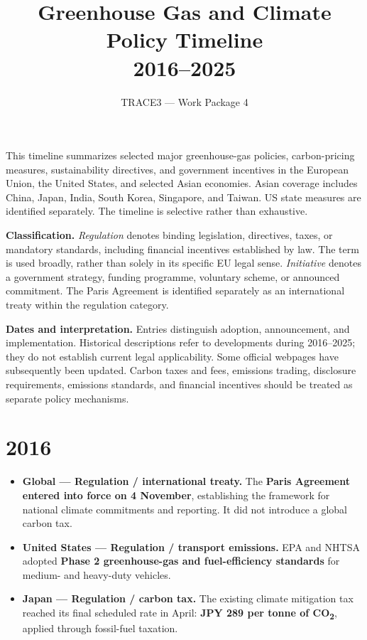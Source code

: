 \documentclass[11pt,a4paper]{article}
\title{Greenhouse Gas and Climate Policy Timeline\\2016--2025}
\author{TRACE3 --- Work Package 4}
\date{}
\newcommand{\entry}[3]{\item \textbf{#1 --- #2.} #3}
\begin{document}
\maketitle

This timeline summarizes selected major greenhouse-gas policies, carbon-pricing measures, sustainability directives, and government incentives in the European Union, the United States, and selected Asian economies. Asian coverage includes China, Japan, India, South Korea, Singapore, and Taiwan. US state measures are identified separately. The timeline is selective rather than exhaustive.

\textbf{Classification.} \emph{Regulation} denotes binding legislation, directives, taxes, or mandatory standards, including financial incentives established by law. The term is used broadly, rather than solely in its specific EU legal sense. \emph{Initiative} denotes a government strategy, funding programme, voluntary scheme, or announced commitment. The Paris Agreement is identified separately as an international treaty within the regulation category.

\textbf{Dates and interpretation.} Entries distinguish adoption, announcement, and implementation. Historical descriptions refer to developments during 2016--2025; they do not establish current legal applicability. Some official webpages have subsequently been updated. Carbon taxes and fees, emissions trading, disclosure requirements, emissions standards, and financial incentives should be treated as separate policy mechanisms.

\section*{2016}
\begin{itemize}
\entry{Global}{Regulation / international treaty}{The \textbf{Paris Agreement entered into force on 4 November}, establishing the framework for national climate commitments and reporting. It did not introduce a global carbon tax.\cite{paris}}
\entry{United States}{Regulation / transport emissions}{EPA and NHTSA adopted \textbf{Phase 2 greenhouse-gas and fuel-efficiency standards} for medium- and heavy-duty vehicles.\cite{usphase2}}
\entry{Japan}{Regulation / carbon tax}{The existing climate mitigation tax reached its final scheduled rate in April: \textbf{JPY 289 per tonne of CO\textsubscript{2}}, applied through fossil-fuel taxation.\cite{japantax}}
\end{itemize}
\end{document}
